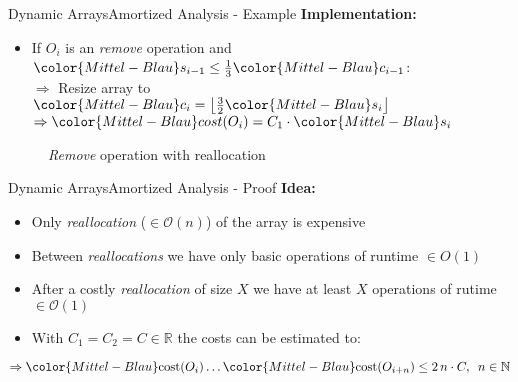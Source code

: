 \begin{frame}{Dynamic Arrays}{Amortized Analysis - Example}
  \textbf{Implementation:}
  \begin{itemize}
    \item
    If {\color{Mittel-Blau}$O_i$} is an \textit{remove} operation and
    ${\color{Mittel-Blau}s_{i-1}}
      \leq \frac{1}{3} {\color{Mittel-Blau}c_{i-1}}$:\\
    $\Rightarrow$ Resize array to
    ${\color{Mittel-Blau}c_i}
      = \left\lfloor\frac{3}{2} {\color{Mittel-Blau}s_i} \right\rfloor$\\
    $\Rightarrow {\color{Mittel-Blau}cost(O_i)}
      = C_1 \cdot {\color{Mittel-Blau}s_i}$
  \end{itemize}
  \begin{figure}[!h]
    \def\FSAsize{12}\def\FSAelements{4}%
    \def\FSAcopy{0}\def\FSAdelete{0}\def\FSAinsert{0}%
    \def\FSAcopyarrow{0}%
    \def\FSAlabelsize{${\color{Mittel-Blau}s_{i-1}} = 4$}%
    \def\FSAlabelcapacity{%
      ${\color{Mittel-Blau}c_{i-1}} = 12%
      \geq {\color{Mittel-Blau}s_{i-1}}$}%
    \hspace*{0.5em}\raisebox{2em}{$\Rightarrow$}\hspace*{0.5em}%
    \def\FSAsize{4}\def\FSAelements{0}%
    \def\FSAcopy{3}\def\FSAdelete{1}\def\FSAinsert{0}%
    \def\FSAlabelsize{${\color{Mittel-Blau}s_i}
      = {\color{Mittel-Blau}s_{i-1}} - 1$}%
    \def\FSAlabelcapacity{${\color{Mittel-Blau}c_i}
      = \frac{3}{2}{\color{Mittel-Blau}s_i}$ = 4}%
    \caption{\textit{Remove} operation with reallocation}
    \label{fig:dynamic_fields:amortized_analysis:remove}
  \end{figure}
\end{frame}


\begin{frame}{Dynamic Arrays}{Amortized Analysis - Proof}
  \textbf{Idea:}
  \begin{itemize}
    \item
      Only \textit{reallocation} ($\in \mathcal{O}(n)$) of the array is
      expensive
    \item
      Between \textit{reallocations} we have only basic operations of runtime 
      $\in O(1)$
    \item
      After a costly \textit{reallocation} of size $X$ we have at least $X$
      operations of rutime $\in \mathcal{O}(1)$
    \item
      With $C_1 = C_2 = C \in \mathbb{R}$ the costs can be estimated to:
  \end{itemize}
  \[\Rightarrow {\color{Mittel-Blau}\mathrm{cost}(O_i)} \dots
    {\color{Mittel-Blau}\mathrm{cost}(O_{i + n})} \leq 2 \, n \cdot C,
    \hspace*{0.5em}n \in \mathbb{N}\]
\end{frame}

